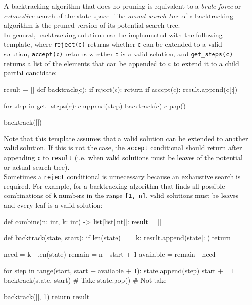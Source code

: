 \documentclass[12pt, titlepage]{article}
\begin{document}
A backtracking algorithm that does no pruning is equivalent to a \textit{brute-force} or \textit{exhaustive} search of the state-space. The \textit{actual search tree} of a backtracking algorithm is the pruned version of its potential search tree. \\

In general, backtracking solutions can be implemented with the following template, where \texttt{reject(c)} returns whether \texttt{c} can be extended to a valid solution, \texttt{accept(c)} returns whether \texttt{c} is a valid solution, and \texttt{get\_steps(c)} returns a list of the elements that can be appended to \texttt{c} to extend it to a child partial candidate: \medskip

\begin{python}
result = []
def backtrack(c):
    if reject(c):
        return
    if accept(c):
        result.append(c[:])

    for step in get_steps(c):
        c.append(step)
        backtrack(c)
        c.pop()

backtrack([])
\end{python} \medskip

Note that this template assumes that a valid solution can be extended to another valid solution. If this is not the case, the \texttt{accept} conditional should return after appending \texttt{c} to \texttt{result} (i.e. when valid solutions must be leaves of the potential or actual search tree). \\

Sometimes a \texttt{reject} conditional is unnecessary because an exhaustive search is required. For example, for a backtracking algorithm that finds all possible combinations of \texttt{k} numbers in the range \texttt{[1, n]}, valid solutions must be leaves and every leaf is a valid solution: \medskip

\begin{python}
def combine(n: int, k: int) -> list[list[int]]:
    result = []

    def backtrack(state, start):
        if len(state) == k:
            result.append(state[:])
            return
       
        need = k - len(state)
        remain = n - start + 1
        available = remain - need

        for step in range(start, start + available + 1):
            state.append(step)
            start += 1
            backtrack(state, start)  # Take
            state.pop()  # Not take

    backtrack([], 1)
    return result
\end{python}
\end{document}
